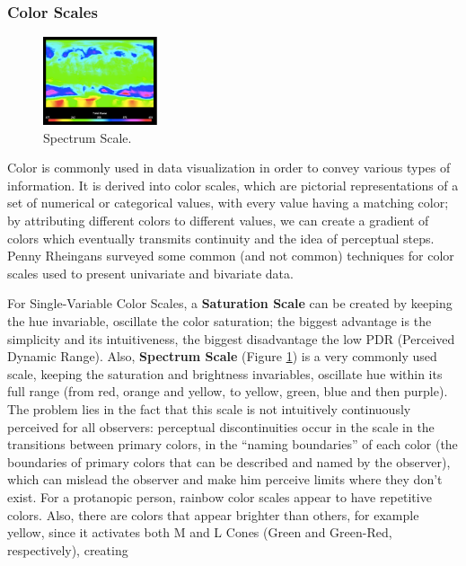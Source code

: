 \subsubsection{Color Scales}
%
\begin{figure}
	\centering
    \vspace{-10pt}
    \includegraphics[width=0.3\textwidth]{images/background/SpectrumScale.png}
    \caption[Spectrum Scale Example]{Spectrum Scale. \protect\cite{Rheingans2000}}
    \label{fig:spectrum}
\end{figure}
%
Color is commonly used in data visualization in order to convey various types of information. It is derived into color scales,
which are pictorial representations of a set of numerical or categorical values, with every value having
a matching color; by attributing different colors to different values, we can create a gradient of colors
which eventually transmits continuity and the idea of perceptual steps. Penny Rheingans \cite{Rheingans2000} surveyed some
common (and not common) techniques for color scales used to present univariate and bivariate data. \par
%
For Single-Variable Color Scales, a \textbf{Saturation Scale} can be created by keeping the hue
invariable, oscillate the color saturation; the biggest advantage is the simplicity and its intuitiveness,
the biggest disadvantage the low PDR (Perceived Dynamic Range). Also, \textbf{Spectrum Scale} (Figure \ref{fig:spectrum})
is a very commonly used scale, keeping the saturation and brightness invariables, oscillate hue within its full
range (from red, orange and yellow, to yellow, green, blue and then purple). The problem lies in the fact that this scale
is not intuitively continuously perceived for all observers:
perceptual discontinuities occur in the scale in the transitions between primary colors, in the “naming boundaries”
of each color (the boundaries of primary colors that can be described and named by the observer), which can mislead the
observer and make him perceive limits where they don’t exist. For a protanopic person, rainbow color scales
appear to have repetitive colors. Also, there are colors that appear brighter than
others, for example yellow, since it activates both M and L Cones (Green and Green-Red, respectively), creating
